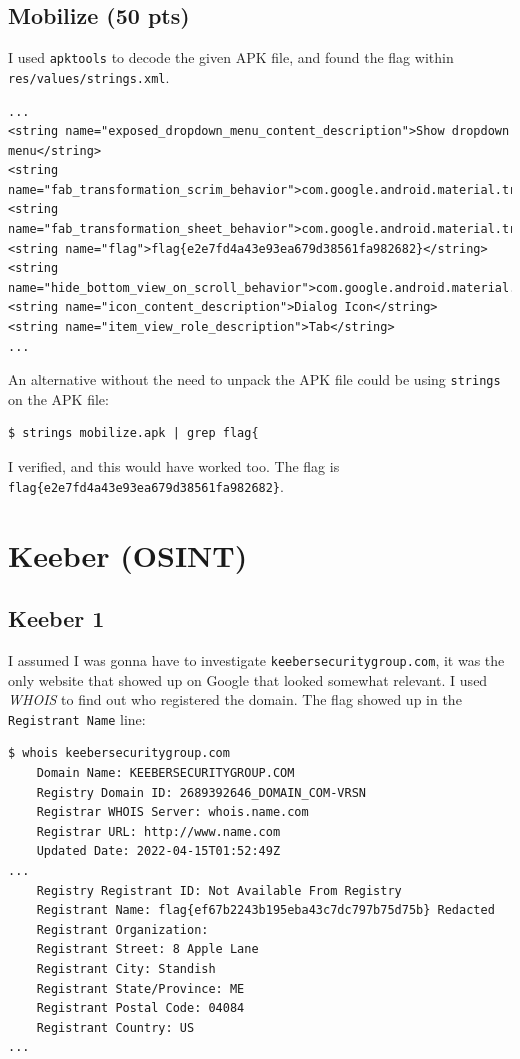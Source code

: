 \documentclass{article}
\begin{document}
\subsection{Mobilize (50 pts)}

I used \texttt{apktools} to decode the given APK file, and found the flag within \texttt{res/values/strings.xml}.

\begin{lstlisting}
...
<string name="exposed_dropdown_menu_content_description">Show dropdown menu</string>
<string name="fab_transformation_scrim_behavior">com.google.android.material.transformation.FabTransformationScrimBehavior</string>
<string name="fab_transformation_sheet_behavior">com.google.android.material.transformation.FabTransformationSheetBehavior</string>
<string name="flag">flag{e2e7fd4a43e93ea679d38561fa982682}</string>
<string name="hide_bottom_view_on_scroll_behavior">com.google.android.material.behavior.HideBottomViewOnScrollBehavior</string>
<string name="icon_content_description">Dialog Icon</string>
<string name="item_view_role_description">Tab</string>
...
\end{lstlisting}

\noindent
An alternative without the need to unpack the APK file could be using \texttt{strings} on the APK file:

\begin{lstlisting}
$ strings mobilize.apk | grep flag{
\end{lstlisting}

\noindent 
I verified, and this would have worked too. The flag is \texttt{flag\{e2e7fd4a43e93ea679d38561fa982682\}}.


\section{Keeber (OSINT)}
\subsection{Keeber 1}

I assumed I was gonna have to investigate \texttt{keebersecuritygroup.com}, it was the only website that showed up on Google that looked somewhat relevant. I used \textit{WHOIS} to find out who registered the domain. The flag showed up in the \texttt{Registrant Name} line:

\begin{Verbatim}[frame=single]
$ whois keebersecuritygroup.com
    Domain Name: KEEBERSECURITYGROUP.COM
    Registry Domain ID: 2689392646_DOMAIN_COM-VRSN
    Registrar WHOIS Server: whois.name.com
    Registrar URL: http://www.name.com
    Updated Date: 2022-04-15T01:52:49Z
...
    Registry Registrant ID: Not Available From Registry 
	Registrant Name: flag{ef67b2243b195eba43c7dc797b75d75b} Redacted 
	Registrant Organization:  
	Registrant Street: 8 Apple Lane  
	Registrant City: Standish 
	Registrant State/Province: ME 
	Registrant Postal Code: 04084 
	Registrant Country: US  
...
\end{Verbatim}
\end{document}
